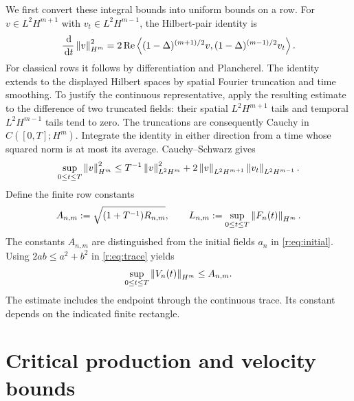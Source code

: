 We first convert these integral bounds into uniform bounds on a row. For
\(v\in L^2H^{m+1}\) with \(v_t\in L^2H^{m-1}\), the Hilbert-pair
identity is
\[
 \frac{\,\mathrm d}{\,\mathrm d t}\left\lVert v\right\rVert_{H^m}^2
 =2\operatorname{Re}\left\langle (1-\Delta)^{(m+1)/2}v,(1-\Delta)^{(m-1)/2}v_t\right\rangle.
\]
For classical rows it follows by differentiation and Plancherel. The identity
extends to the displayed Hilbert spaces by spatial Fourier truncation and
time smoothing. To justify the continuous representative, apply the resulting
estimate to the difference of two truncated fields: their spatial
\(L^2H^{m+1}\) tails and temporal \(L^2H^{m-1}\) tails tend to zero.
The truncations are consequently Cauchy in \(C([0,T];H^m)\). Integrate
the identity in either direction from a time whose squared norm is at most
its average. Cauchy--Schwarz gives
\begin{equation}
 \sup_{0\le t\le T}\left\lVert v\right\rVert_{H^m}^2
 \le T^{-1}\left\lVert v\right\rVert_{L^2H^m}^2
 +2\left\lVert v\right\rVert_{L^2H^{m+1}}\left\lVert v_t\right\rVert_{L^2H^{m-1}}.
 \label{r:eq:trace}
\end{equation}
Define the finite row constants
\begin{equation}
 A_{n,m}:=\sqrt{(1+T^{-1})R_{n,m}},
 \qquad L_{n,m}:=\sup_{0\le t\le T}\left\lVert F_n(t)\right\rVert_{H^m}.
 \label{r:eq:constants}
\end{equation}
The constants \(A_{n,m}\) are distinguished from the initial fields
\(a_n\) in \eqref{r:eq:initial}.
Using \(2ab\le a^2+b^2\) in \eqref{r:eq:trace} yields
\begin{equation}
 \sup_{0\le t\le T}\left\lVert V_n(t)\right\rVert_{H^m}\le A_{n,m}.
 \label{r:eq:uniform-row}
\end{equation}
The estimate includes the endpoint through the continuous trace.
Its constant depends on the indicated finite rectangle.

\section{Critical production and velocity bounds}\label{r:sec:critical}

